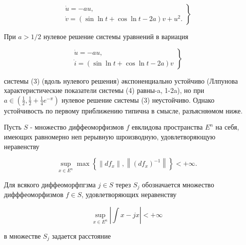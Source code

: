 \documentclass[10pt]{article}
\begin{document}
\[

\left.\begin{array}{l}

\dot{u}=-a u, \\

\dot{v}=(\sin \ln t+\cos \ln t-2 a) v+u^{2} .

\end{array}\right\}

\]



При $a>1 / 2$ нулевое решение системы уравнений в вариация



\[

\left.\begin{array}{l}

\dot{u}=-a u, \\

\dot{i}=(\sin \ln t+\cos \ln t-2 a) v

\end{array}\right\}

\]



системы (3) (вдоль нулевого решения) әкспоненциально устойчиво (Ллпунова характеристические показатели системы (4) равны-a, 1-2a), но при $a \in\left(\frac{1}{2}, \frac{1}{2}+\frac{1}{4} e^{-\pi}\right)$ нулевое решение системы (3) неустойчиво. Однако устойчивость по первому приближению типична в смысле, разъясняөмом ниже.



Пусть $S$ - множество диффеоморфизмов $f$ евклидова пространства $E^{n}$ на себя, имеющих равномерно неп рерывную шроизводную, удовлетворяющую неравенству



\[

\sup _{x \in E^{n}} \max \left\{\left\|d f_{x}\right\|,\left\|\left(d f_{x}\right)^{-1}\right\|\right\}<+\infty .

\]



Для всякого диффеоморфпгзма $j \in S$ терез $S_{j}$ обозначается множество дифффеоморфизмов $f \in S$, удовлетворяющих неравенству



\[

\sup _{x \in E^{n}}\left|\int x-j x\right|<+\infty

\]



в множестве $S_{j}$ задается расстояние
\end{document}
